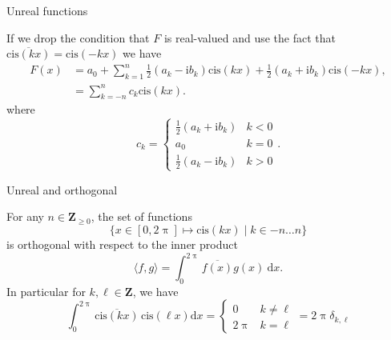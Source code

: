 \documentclass[portrait,fleqn,12pt]{beamer}
\newcommand{\integers}{\mathbf{Z}}
\newcommand{\cis}{\mathrm{cis}}
\newcommand{\imag}{\mathrm{i}}
\begin{document}
\begin{frame}{Unreal functions}

If we drop the condition that $F$ is real-valued and use the fact that $\overline{\cis(k x) } = \cis(-kx)$ we have
\begin{align*}
F(x)    &= a_0 + \sum_{k=1}^n \frac{1}{2} (a_k  - \imag b_k) \cis(k x) +   \frac{1}{2} (a_k  + \imag b_k) \cis(-k x) ,   \\
         &= \sum_{k=-n}^n c_k \cis(k x).
\end{align*}
where
\begin{equation*}
  c_k = \begin{cases} \frac{1}{2} (a_k  + \imag b_k) & k < 0 \\
                                       a_0 & k = 0 \\
                                       \frac{1}{2} (a_k  - \imag b_k) & k > 0
       \end{cases}.
\end{equation*}
\end{frame}

\begin{frame}{Unreal and orthogonal}

For any $n \in \integers_{\geq 0}$,  the set of functions
\begin{equation*}
  \{ x \in [0, 2 \uppi]  \mapsto \cis(k x) \mid k \in -n \dots n \}
\end{equation*}
is orthogonal with respect to the inner product
\begin{equation*}
  \langle f, g  \rangle = \int_0^{2 \uppi} \overline{f(x)} g(x) \ \mathrm{d} x.
\end{equation*}
In particular for $k, \ell \in \integers$, we have
\begin{equation*}
 \int_0^{2 \uppi}  \overline{ \cis(k x) } \, \cis(\ell x) \mathrm{d} x = \begin{cases} 0 & k \neq \ell \\ 2 \uppi & k = \ell \end{cases}
     = 2 \uppi \delta_{k, \ell}
 \end{equation*}
\end{frame}
\end{document}
